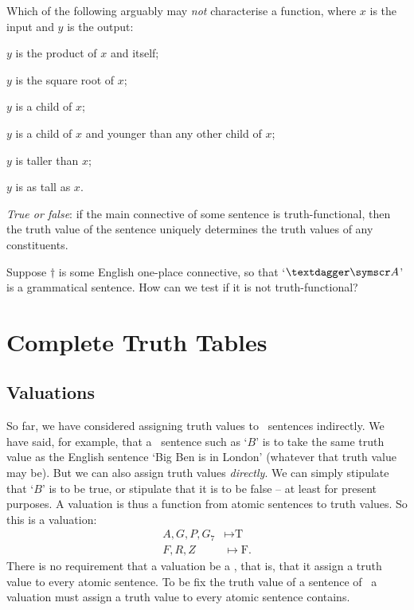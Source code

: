 \practiceproblems

\problempart Which of the following arguably may \emph{not} characterise a function, where $x$ is the input and $y$ is the output: \begin{earg}
	\item $y$ is the product of $x$ and itself;
	\item $y$ is the square root of $x$;
	\item $y$ is a child of $x$;
	\item $y$ is a child of $x$ and younger than any other child of $x$;
	\item $y$ is taller than $x$;
	\item $y$ is as tall as $x$. 
\end{earg}  
\problempart
\emph{True or false}: if the main connective of some sentence is truth-functional, then the truth value of the sentence uniquely determines the truth values of any constituents.

\problempart Suppose $†$ is some English one-place connective, so that `$†\meta{A}$' is a grammatical sentence. How can we test if it is not truth-functional?



\chapter{Complete Truth Tables}\label{s:CompleteTruthTables}

\section{Valuations}\label{s:valuations}

So far, we have considered assigning truth values to \TFL\ sentences indirectly. We have said, for example, that a \TFL\ sentence such as `$B$' is to take the same truth value as the English sentence `Big Ben is in London' (whatever that truth value may be). But we can also assign truth values \emph{directly}. We can simply stipulate that `$B$' is to be true, or stipulate that it is to be false – at least for present purposes. 
A valuation is thus a function from atomic sentences to truth values. So this is a valuation: \begin{align*}
	A, G, P, G_{7}  &\mapsto \text{T}\\ 
	F, R, Z &\mapsto \text{F}.
\end{align*} There is no requirement that a valuation be a , that is, that it assign a truth value to every atomic sentence. To be fix the truth value of a sentence  of \TFL\ a valuation must assign a truth value to every atomic sentence  contains.


